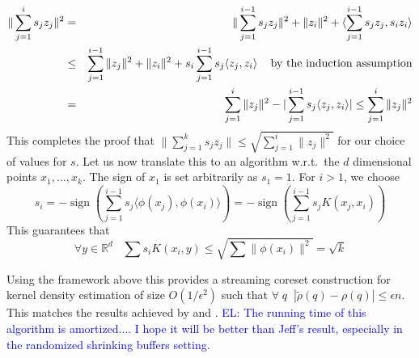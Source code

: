 \documentclass{article} %
\newcommand{\el}[1]{\textcolor{blue}{EL: #1}}
\newcommand{\R}{\mathbb{R}}
\newcommand{\eps}{\epsilon}
\begin{document}
\begin{eqnarray*}
\| \sum_{j=1}^{i}s_j z_j\|^2 &=& \|\sum_{j=1}^{i-1}s_j z_j\|^2 + \|z_i\|^2 + \langle \sum_{j=1}^{i-1}s_j z_j, s_i z_i\rangle \\
&\le& \sum_{j=1}^{i-1} \|z_j\|^2 + \|z_i\|^2 + s_i \sum_{j=1}^{i-1}s_j \langle  z_j,  z_i\rangle \mbox{\;\;\; by the induction assumption}\\ 
&=& \sum_{j=1}^{i} \|z_j\|^2 - |\sum_{j=1}^{i-1}s_j \langle  z_j,  z_i\rangle| \le \sum_{j=1}^{i} \|z_j\|^2
\end{eqnarray*}
This completes the proof that $\| \sum_{j=1}^{k}s_j z_j\| \le \sqrt{\sum_{j=1}^{i} \|z_j\|^2}$ for our choice of values for $s$. 
%
Let us now translate this to an algorithm w.r.t.\ the $d$ dimensional points $x_1,\ldots, x_k$. 
The sign of $x_1$ is set arbitrarily as $s_1=1$. For $i>1$, we choose 
$$ s_i = -\operatorname{sign} (\sum_{j=1}^{i-1}s_j \langle \phi(x_j), \phi(x_i) \rangle) = -\operatorname{sign} (\sum_{j=1}^{i-1}s_j  K(x_j, x_i))$$
This guarantees that 
$$ \forall y \in \R^d \;\;\; \sum s_i K(x_i, y) \leq \sqrt{ \sum \|\phi(x_i)\|^2 } = \sqrt{k} $$

Using the framework above this provides a streaming coreset construction for kernel density estimation of size $O(1/\eps^2)$ such that 
$\forall \;q\;\; |\tilde \rho(q) - \rho(q)| \le \eps n$.
This matches the results achieved by \cite{DBLP:conf/soda/PhillipsT18} and \cite{DBLP:journals/corr/abs-1802-01751}.
\el{The running time of this algorithm is amortized.... I hope it will be better than Jeff's result, especially in the randomized shrinking buffers setting.}





%
%
\end{document}
